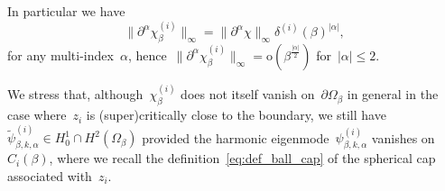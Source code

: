 \documentclass[10pt]{article}
\newcommand{\1}{\mathbbm 1}
\newcommand{\deltai}{\delta^{(i)}}
\begin{document}
    In particular we have
    \begin{equation}
        \label{eq:linf_bound_nabla_chi}
        \|\partial^\alpha\chi_\beta^{(i)}\|_\infty = \|\partial^\alpha \chi\|_\infty \deltai(\beta)^{|\alpha|},
    \end{equation}
    for any multi-index~$\alpha$, hence~$\|\partial^\alpha \chi_\beta^{(i)}\|_\infty = \mathrm{o}(\beta^{\frac{|\alpha|}2})$ for~$|\alpha|\leq 2$.
    
    We stress that, although~$\chi_\beta^{(i)}$ does not itself vanish on~$\partial \Omega_\beta$ in general in the case where~$z_i$ is (super)critically close to the boundary, we still have
   ~$\widetilde\psi_{\beta,k,\alpha}^{(i)}\in H_0^1\cap H^2(\Omega_\beta)$ provided the harmonic eigenmode~$\psi_{\beta,k,\alpha}^{(i)}$ vanishes on~$C_i(\beta)$, where we recall the definition~\eqref{eq:def_ball_cap} of the spherical cap associated with~$z_i$.
    
\end{document}
